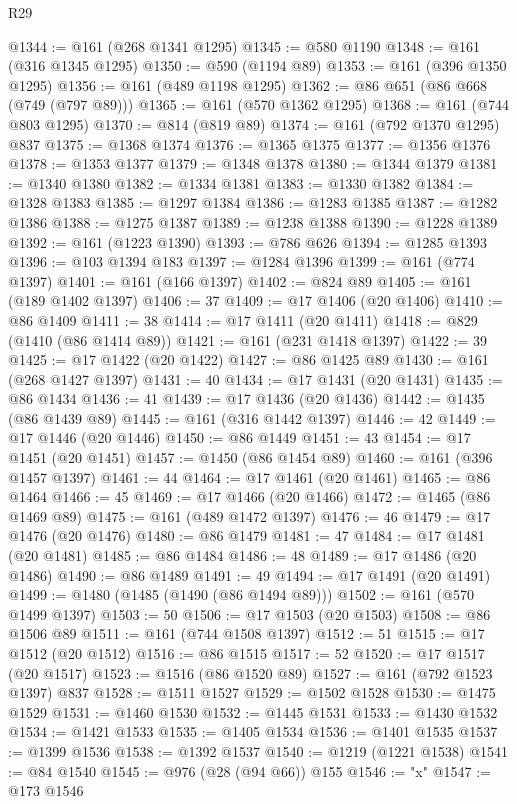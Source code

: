 \begin{lexlean}{R29}
\begin{coremodule}
@1344 := @161 (@268 @1341 @1295)
@1345 := @580 @1190
@1348 := @161 (@316 @1345 @1295)
@1350 := @590 (@1194 @89)
@1353 := @161 (@396 @1350 @1295)
@1356 := @161 (@489 @1198 @1295)
@1362 := @86 @651 (@86 @668 (@749 (@797 @89)))
@1365 := @161 (@570 @1362 @1295)
@1368 := @161 (@744 @803 @1295)
@1370 := @814 (@819 @89)
@1374 := @161 (@792 @1370 @1295) @837
@1375 := @1368 @1374
@1376 := @1365 @1375
@1377 := @1356 @1376
@1378 := @1353 @1377
@1379 := @1348 @1378
@1380 := @1344 @1379
@1381 := @1340 @1380
@1382 := @1334 @1381
@1383 := @1330 @1382
@1384 := @1328 @1383
@1385 := @1297 @1384
@1386 := @1283 @1385
@1387 := @1282 @1386
@1388 := @1275 @1387
@1389 := @1238 @1388
@1390 := @1228 @1389
@1392 := @161 (@1223 @1390)
@1393 := @786 @626
@1394 := @1285 @1393
@1396 := @103 @1394 @183
@1397 := @1284 @1396
@1399 := @161 (@774 @1397)
@1401 := @161 (@166 @1397)
@1402 := @824 @89
@1405 := @161 (@189 @1402 @1397)
@1406 := 37
@1409 := @17 @1406 (@20 @1406)
@1410 := @86 @1409
@1411 := 38
@1414 := @17 @1411 (@20 @1411)
@1418 := @829 (@1410 (@86 @1414 @89))
@1421 := @161 (@231 @1418 @1397)
@1422 := 39
@1425 := @17 @1422 (@20 @1422)
@1427 := @86 @1425 @89
@1430 := @161 (@268 @1427 @1397)
@1431 := 40
@1434 := @17 @1431 (@20 @1431)
@1435 := @86 @1434
@1436 := 41
@1439 := @17 @1436 (@20 @1436)
@1442 := @1435 (@86 @1439 @89)
@1445 := @161 (@316 @1442 @1397)
@1446 := 42
@1449 := @17 @1446 (@20 @1446)
@1450 := @86 @1449
@1451 := 43
@1454 := @17 @1451 (@20 @1451)
@1457 := @1450 (@86 @1454 @89)
@1460 := @161 (@396 @1457 @1397)
@1461 := 44
@1464 := @17 @1461 (@20 @1461)
@1465 := @86 @1464
@1466 := 45
@1469 := @17 @1466 (@20 @1466)
@1472 := @1465 (@86 @1469 @89)
@1475 := @161 (@489 @1472 @1397)
@1476 := 46
@1479 := @17 @1476 (@20 @1476)
@1480 := @86 @1479
@1481 := 47
@1484 := @17 @1481 (@20 @1481)
@1485 := @86 @1484
@1486 := 48
@1489 := @17 @1486 (@20 @1486)
@1490 := @86 @1489
@1491 := 49
@1494 := @17 @1491 (@20 @1491)
@1499 := @1480 (@1485 (@1490 (@86 @1494 @89)))
@1502 := @161 (@570 @1499 @1397)
@1503 := 50
@1506 := @17 @1503 (@20 @1503)
@1508 := @86 @1506 @89
@1511 := @161 (@744 @1508 @1397)
@1512 := 51
@1515 := @17 @1512 (@20 @1512)
@1516 := @86 @1515
@1517 := 52
@1520 := @17 @1517 (@20 @1517)
@1523 := @1516 (@86 @1520 @89)
@1527 := @161 (@792 @1523 @1397) @837
@1528 := @1511 @1527
@1529 := @1502 @1528
@1530 := @1475 @1529
@1531 := @1460 @1530
@1532 := @1445 @1531
@1533 := @1430 @1532
@1534 := @1421 @1533
@1535 := @1405 @1534
@1536 := @1401 @1535
@1537 := @1399 @1536
@1538 := @1392 @1537
@1540 := @1219 (@1221 @1538)
@1541 := @84 @1540
@1545 := @976 (@28 (@94 @66)) @155
@1546 := "x"
@1547 := @173 @1546

\end{coremodule}
\end{lexlean}
